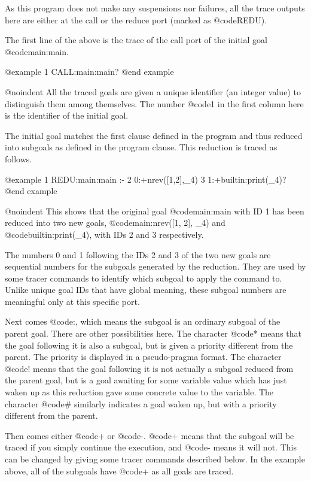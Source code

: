 {{{{As this program does not make any suspensions nor failures, all the
trace outputs here are either at the call or the reduce port (marked
as @code{REDU}).

The first line of the above is the trace of the call port of the
initial goal @code{main:main}.

@example
   1 CALL:main:main? 
@end example

@noindent
All the traced goals are given a unique identifier (an integer value) to
distinguish them among themselves.  The number @code{1} in the first
column here is the identifier of the initial goal.

The initial goal matches the first clause defined in the program and
thus reduced into subgoals as defined in the program clause.  This
reduction is traced as follows.

@example
   1 REDU:main:main :-
   2   0:+nrev([1,2],_4)
   3   1:+builtin:print(_4)? 
@end example

@noindent
This shows that the original goal @code{main:main} with ID 1 has been
reduced into two new goals, @code{main:nrev([1, 2], _4)} and
@code{builtin:print(_4)}, with IDs 2 and 3 respectively.

The numbers 0 and 1 following the IDs 2 and 3 of the two new goals are
sequential numbers for the subgoals generated by the reduction.  They
are used by some tracer commands to identify which subgoal to apply the
command to.  Unlike unique goal IDs that have global meaning, these
subgoal numbers are meaningful only at this specific port.

Next comes @code{:}, which means the subgoal is an ordinary subgoal of
the parent goal.  There are other possibilities here.  The character
@code{*} means that the goal following it is also a subgoal, but is
given a priority different from the parent.  The priority is displayed
in a pseudo-pragma format.  The character @code{!} means that the goal
following it is not actually a subgoal reduced from the parent goal, but
is a goal awaiting for some variable value which has just waken up as
this reduction gave some concrete value to the variable.  The character
@code{#} similarly indicates a goal waken up, but with a priority
different from the parent.

Then comes either @code{+} or @code{-}.  @code{+} means that the subgoal
will be traced if you simply continue the execution, and @code{-} means
it will not.  This can be changed by giving some tracer commands
described below.  In the example above, all of the subgoals have
@code{+} as all goals are traced.

}}}}
